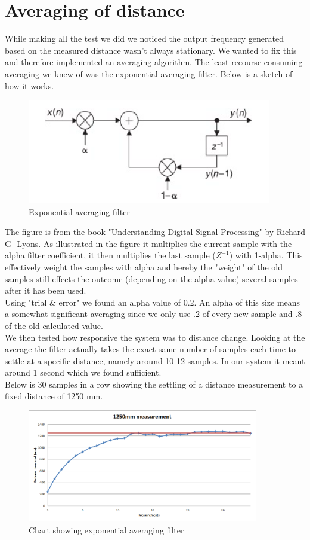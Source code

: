 \section{Averaging of distance}
While making all the test we did we noticed the output frequency generated based on the measured distance wasn't always stationary. We wanted to fix this and therefore implemented an averaging algorithm. The least recourse consuming averaging we knew of was the exponential averaging filter. Below is a sketch of how it works.\\
\begin{figure}[H]
\centering
\includegraphics[width=.5\textwidth]{billeder/exp_avg}
\caption{Exponential averaging filter}
\end{figure}
The figure is from the book "Understanding Digital Signal Processing" by Richard G- Lyons. As illustrated in the figure it multiplies the current sample with the alpha filter coefficient, it then multiplies the last sample ($Z^{-1}$) with 1-alpha. This effectively  weight the samples with alpha and hereby the "weight" of the old samples still effects the outcome (depending on the alpha value) several samples after it has been used.\\
Using "trial \& error" we found an alpha value of 0.2. An alpha of this size means a somewhat significant averaging since we only use .2 of every new sample and .8 of the old calculated value.\\
We then tested how responsive the system was to distance change. Looking at the average the filter actually takes the exact same number of samples each time to settle at a specific distance, namely around 10-12 samples. In our system it meant around 1 second which we found sufficient.\\
Below is 30 samples in a row showing the settling of a distance measurement to a fixed distance of 1250 mm.\\
\begin{figure}[H]
\centering
\includegraphics[width=0.9\textwidth]{billeder/avg_chart}
\caption{Chart showing exponential averaging filter}
\end{figure}